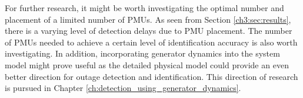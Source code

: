 For further research, it might be worth investigating the optimal number and placement of a limited number of PMUs. As seen from Section \ref{ch3:sec:results}, there is a varying level of detection delays due to PMU placement. The number of PMUs needed to achieve a certain level of identification accuracy is also worth investigating. In addition, incorporating generator dynamics into the system model might prove useful as the detailed physical model could provide an even better direction for outage detection and identification. This direction of research is pursued in Chapter \ref{ch:detection_using_generator_dynamics}.











